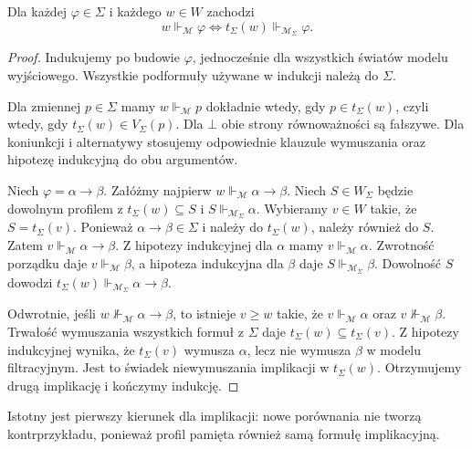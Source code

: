 \begin{twierdzenie}
\label{thm:ncl-ipc-filtration}
Dla każdej $\varphi\in\Sigma$ i każdego $w\in W$
zachodzi
\[
 w\Vdash_{\mathcal M}\varphi
 \iff t_\Sigma(w)\Vdash_{\mathcal M_\Sigma}\varphi.
\]
\end{twierdzenie}
\begin{proof}
Indukujemy po budowie $\varphi$, jednocześnie
dla wszystkich światów modelu wyjściowego.
Wszystkie podformuły używane w indukcji należą
do $\Sigma$.

Dla zmiennej $p\in\Sigma$ mamy
$w\Vdash_{\mathcal M}p$ dokładnie wtedy, gdy
$p\in t_\Sigma(w)$, czyli wtedy, gdy
$t_\Sigma(w)\in V_\Sigma(p)$.
Dla $\bot$ obie strony równoważności są fałszywe.
Dla koniunkcji i alternatywy stosujemy odpowiednie
klauzule wymuszania oraz hipotezę indukcyjną
do obu argumentów.

Niech $\varphi=\alpha\to\beta$.
Załóżmy najpierw $w\Vdash_{\mathcal M}\alpha\to\beta$.
Niech $S\in W_\Sigma$ będzie dowolnym profilem
z $t_\Sigma(w)\subseteq S$ i
$S\Vdash_{\mathcal M_\Sigma}\alpha$.
Wybieramy $v\in W$ takie, że $S=t_\Sigma(v)$.
Ponieważ $\alpha\to\beta\in\Sigma$ i należy
do $t_\Sigma(w)$, należy również do $S$.
Zatem $v\Vdash_{\mathcal M}\alpha\to\beta$.
Z hipotezy indukcyjnej dla $\alpha$ mamy
$v\Vdash_{\mathcal M}\alpha$.
Zwrotność porządku daje $v\Vdash_{\mathcal M}\beta$,
a hipoteza indukcyjna dla $\beta$ daje
$S\Vdash_{\mathcal M_\Sigma}\beta$.
Dowolność $S$ dowodzi
$t_\Sigma(w)\Vdash_{\mathcal M_\Sigma}\alpha\to\beta$.

Odwrotnie, jeśli $w\not\Vdash_{\mathcal M}\alpha\to\beta$,
to istnieje $v\geq w$ takie, że
$v\Vdash_{\mathcal M}\alpha$ oraz
$v\not\Vdash_{\mathcal M}\beta$.
Trwałość wymuszania wszystkich formuł z $\Sigma$
daje $t_\Sigma(w)\subseteq t_\Sigma(v)$.
Z hipotezy indukcyjnej wynika, że
$t_\Sigma(v)$ wymusza $\alpha$, lecz nie wymusza
$\beta$ w modelu filtracyjnym.
Jest to świadek niewymuszania implikacji w
$t_\Sigma(w)$. Otrzymujemy drugą implikację
i kończymy indukcję.
\end{proof}
Istotny jest pierwszy kierunek dla implikacji:
nowe porównania nie tworzą kontrprzykładu, ponieważ
profil pamięta również samą formułę implikacyjną.

